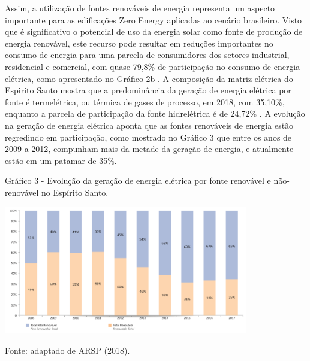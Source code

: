 \begin{onehalfspace}
Assim, a utilização de fontes renováveis de energia representa um aspecto importante para as edificações Zero Energy aplicadas ao cenário brasileiro. Visto que é significativo o potencial de uso da energia solar como fonte de produção de energia renovável, este recurso pode resultar em reduções importantes no consumo de energia para uma parcela de consumidores dos setores industrial, residencial e comercial, com quase 79,8\% de participação no consumo de energia elétrica, como apresentado no Gráfico 2b \cite{Cronemberger2012,EmpresadePesquisaEnergetica-EPE2019,Sorgato2018,Sudhakar2019}.\vspace{0.3cm} \newline
A composição da matriz elétrica do Espirito Santo mostra que a predominância da geração de energia elétrica por fonte é termelétrica, ou térmica de gases de processo, em 2018, com 35,10\%, enquanto a parcela de participação da fonte hidrelétrica é de 24,72\% \cite{AgenciadeRegulacaodeServicosPublicosdoEspiritoSanto-ARSP2018}.\vspace{0.3cm} \newline
A evolução na geração de energia elétrica aponta que as fontes renováveis de energia estão regredindo em participação, como mostrado no Gráfico 3 que entre os anos de 2009 a 2012, compunham mais da metade da geração de energia, e atualmente estão em um patamar de 35\%.%

        \begin{graph}
            \par \small Gráfico 3 - Evolução da geração de energia elétrica por fonte renovável e não-renovável no Espírito Santo.
            \begin{minipage}[ht]{1\textwidth}\centering
                \includegraphics[width=0.8\textwidth]{graphs/graph2_geracao_de_energia_eletrica_no_es-arsp_2018.png}
            \end{minipage}
            \begin{flushleft}
                \par \small Fonte: adaptado de ARSP (2018).
            \end{flushleft}
        \end{graph}


\end{onehalfspace}

